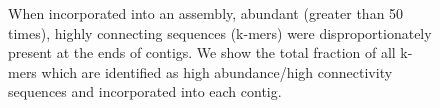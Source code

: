 \documentclass[10pt]{article}
\begin{document}
\begin{figure}
\caption{When incorporated into an assembly, abundant (greater than 50 times), highly connecting sequences (k-mers) were disproportionately present at the ends of contigs.  We show the total fraction of all k-mers which are identified as high abundance/high connectivity sequences and incorporated into each contig.}
\end{figure}
\end{document}
